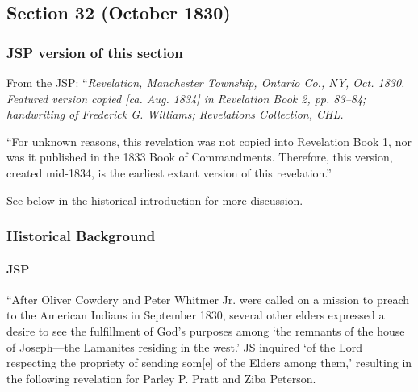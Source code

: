 \subsection{Section 32 (October 1830)}
	\label{DC32}
	
	\subsubsection{JSP version of this section}
	
		From the JSP: ``\textit{Revelation, Manchester Township, Ontario Co., NY, Oct. 1830. Featured version copied [ca. Aug. 1834] in Revelation Book 2, pp. 83--84; handwriting of Frederick G. Williams; Revelations Collection, CHL.}
		
		``For unknown reasons, this revelation was not copied into Revelation Book 1, nor was it published in the 1833 Book of Commandments. Therefore, this version, created mid-1834, is the earliest extant version of this revelation.''
		
		See below in the historical introduction for more discussion.

	\subsubsection{Historical Background}
		\label{DC32-HB}
		
		\paragraph{JSP}
		
			``After Oliver Cowdery and Peter Whitmer Jr. were called on a mission to preach to the American Indians in September 1830, several other elders expressed a desire to see the fulfillment of God's purposes among `the remnants of the house of Joseph---the Lamanites residing in the west.' JS inquired `of the Lord respecting the propriety of sending som[e] of the Elders among them,' resulting in the following revelation for Parley P. Pratt and Ziba Peterson.

